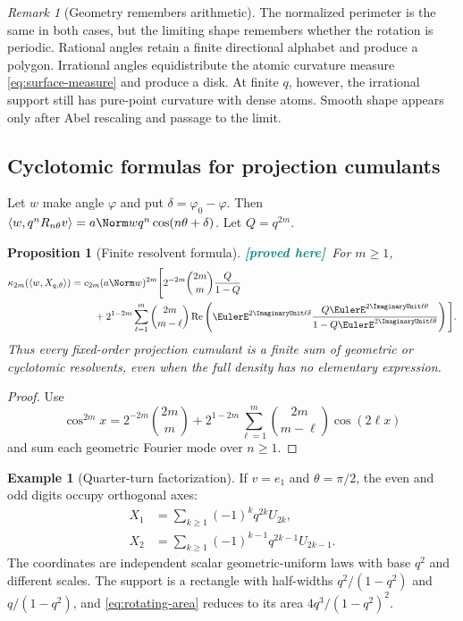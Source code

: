 \documentclass[11pt,oneside]{article}
\newtheorem{proposition}[theorem]{Proposition}
\theoremstyle{definition}
\newtheorem{example}[theorem]{Example}
\theoremstyle{remark}
\newtheorem{remark}[theorem]{Remark}
\newcommand{\ip}[2]{\left\langle #1,#2\right\rangle}
\newcommand{\New}{\textcolor{teal}{\textbf{[proved here]}}}
\begin{document}
\begin{remark}[Geometry remembers arithmetic]
The normalized perimeter is the same in both cases, but the limiting shape
remembers whether the rotation is periodic.  Rational angles retain a finite
directional alphabet and produce a polygon.  Irrational angles equidistribute
the atomic curvature measure \eqref{eq:surface-measure} and produce a disk.
At finite $q$, however, the irrational support still has pure-point curvature
with dense atoms.  Smooth shape appears only after Abel rescaling and passage to
the limit.
\end{remark}

\subsection{Cyclotomic formulas for projection cumulants}

Let $w$ make angle $\varphi$ and put $\delta=\varphi_0-\varphi$.  Then
$\ip{w}{q^nR_{n\theta}v}=a\Norm w q^n\cos(n\theta+\delta)$.  Let
$Q=q^{2m}$.

\begin{proposition}[Finite resolvent formula]
\label{prop:rotating-cumulants}
\New\ For $m\ge1$,
\begin{align}
 \kappa_{2m}(\ip{w}{X_{q,\theta}})
 ={}&c_{2m}(a\Norm w)^{2m}
 \Bigg[
 2^{-2m}\binom{2m}{m}\frac{Q}{1-Q}
 \nonumber\\
 &\quad+2^{1-2m}\sum_{\ell=1}^m\binom{2m}{m-\ell}
 \operatorname{Re}\left(
 \EulerE^{2\ImaginaryUnit\ell\delta}
 \frac{Q\EulerE^{2\ImaginaryUnit\ell\theta}}
      {1-Q\EulerE^{2\ImaginaryUnit\ell\theta}}
 \right)\Bigg].
 \label{eq:rotating-cumulant}
\end{align}
Thus every fixed-order projection cumulant is a finite sum of geometric or
cyclotomic resolvents, even when the full density has no elementary expression.
\end{proposition}

\begin{proof}
Use
\[
 \cos^{2m}x=2^{-2m}\binom{2m}{m}
 +2^{1-2m}\sum_{\ell=1}^m\binom{2m}{m-\ell}\cos(2\ell x)
\]
and sum each geometric Fourier mode over $n\ge1$.
\end{proof}

\begin{example}[Quarter-turn factorization]
If $v=e_1$ and $\theta=\pi/2$, the even and odd digits occupy orthogonal axes:
\begin{align*}
 X_1&=\sum_{k\ge1}(-1)^kq^{2k}U_{2k},\\
 X_2&=\sum_{k\ge1}(-1)^{k-1}q^{2k-1}U_{2k-1}.
\end{align*}
The coordinates are independent scalar geometric-uniform laws with base $q^2$
and different scales.  The support is a rectangle with half-widths
$q^2/(1-q^2)$ and $q/(1-q^2)$, and \eqref{eq:rotating-area} reduces to its area
$4q^3/(1-q^2)^2$.
\end{example}
\end{document}
